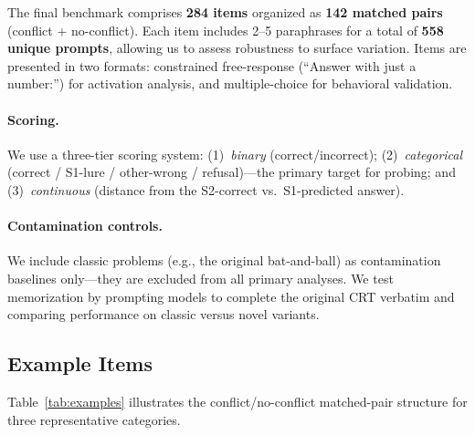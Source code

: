 The final benchmark comprises \textbf{284 items} organized as \textbf{142
matched pairs} (conflict + no-conflict).  Each item includes 2--5
paraphrases for a total of \textbf{558 unique prompts}, allowing us to
assess robustness to surface variation.  Items are presented in two formats:
constrained free-response (``Answer with just a number:'') for activation
analysis, and multiple-choice for behavioral validation.

\paragraph{Scoring.}  We use a three-tier scoring system: (1)~\emph{binary}
(correct/incorrect); (2)~\emph{categorical} (correct / S1-lure / other-wrong
/ refusal)---the primary target for probing; and (3)~\emph{continuous}
(distance from the S2-correct vs.\ S1-predicted answer).

\paragraph{Contamination controls.}  We include classic problems (e.g., the
original bat-and-ball) as contamination baselines only---they are excluded from
all primary analyses.  We test memorization by prompting models to complete the
original CRT verbatim and comparing performance on classic versus novel variants.

\subsection{Example Items}

Table~\ref{tab:examples} illustrates the conflict/no-conflict matched-pair
structure for three representative categories.

